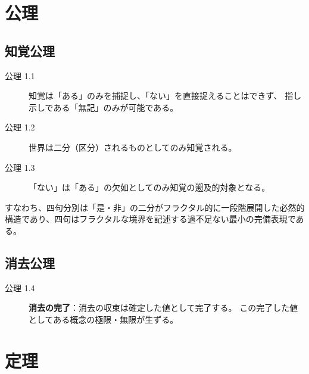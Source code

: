 \documentclass[11pt,a4paper]{ltjsarticle}
\begin{document}
\section{公理}

\subsection{知覚公理}
\begin{description}
  \item[公理 1.1] 知覚は「ある」のみを捕捉し、「ない」を直接捉えることはできず、
  指し示しである「無記」のみが可能である。
  \item[公理 1.2] 世界は二分（区分）されるものとしてのみ知覚される。
  \item[公理 1.3] 「ない」は「ある」の欠如としてのみ知覚の遡及的対象となる。
\end{description}

すなわち、四句分別は「是・非」の二分がフラクタル的に一段階展開した必然的構造であり、四句はフラクタルな境界を記述する過不足ない最小の完備表現である。

\subsection{消去公理}
\begin{description}
  \item[公理 1.4] \textbf{消去の完了}：消去の収束は確定した値として完了する。
  この完了した値としてある概念の極限・無限が生ずる。
\end{description}

\section{定理}
\end{document}
